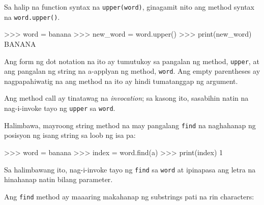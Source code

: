 \documentclass[10pt,]{book}
\newenvironment{Shaded}{}{}
\newcommand{\BuiltInTok}[1]{\textcolor[rgb]{0.00,0.50,0.00}{#1}}
\newcommand{\DecValTok}[1]{\textcolor[rgb]{0.25,0.63,0.44}{#1}}
\newcommand{\NormalTok}[1]{#1}
\newcommand{\OperatorTok}[1]{\textcolor[rgb]{0.40,0.40,0.40}{#1}}
\newcommand{\StringTok}[1]{\textcolor[rgb]{0.25,0.44,0.63}{#1}}
\begin{document}
Sa halip na function syntax na \texttt{upper(word)}, ginagamit nito ang
method syntax na \texttt{word.upper()}.


\begin{Shaded}
\begin{Highlighting}[]
\OperatorTok{\textgreater{}\textgreater{}\textgreater{}}\NormalTok{ word }\OperatorTok{=} \StringTok{\textquotesingle{}banana\textquotesingle{}}
\OperatorTok{\textgreater{}\textgreater{}\textgreater{}}\NormalTok{ new\_word }\OperatorTok{=}\NormalTok{ word.upper()}
\OperatorTok{\textgreater{}\textgreater{}\textgreater{}} \BuiltInTok{print}\NormalTok{(new\_word)}
\NormalTok{BANANA}
\end{Highlighting}
\end{Shaded}

Ang form ng dot notation na ito ay tumutukoy sa pangalan ng method,
\texttt{upper}, at ang pangalan ng string na a-applyan ng method,
\texttt{word}. Ang empty parentheses ay nagpapahiwatig na ang method na
ito ay hindi tumatanggap ng argument.


Ang method call ay tinatawag na \emph{invocation}; sa kasong ito,
sasabihin natin na nag-i-invoke tayo ng \texttt{upper} sa \texttt{word}.


Halimbawa, mayroong string method na may pangalang \texttt{find} na
naghahanap ng posisyon ng isang string sa loob ng isa pa:

\begin{Shaded}
\begin{Highlighting}[]
\OperatorTok{\textgreater{}\textgreater{}\textgreater{}}\NormalTok{ word }\OperatorTok{=} \StringTok{\textquotesingle{}banana\textquotesingle{}}
\OperatorTok{\textgreater{}\textgreater{}\textgreater{}}\NormalTok{ index }\OperatorTok{=}\NormalTok{ word.find(}\StringTok{\textquotesingle{}a\textquotesingle{}}\NormalTok{)}
\OperatorTok{\textgreater{}\textgreater{}\textgreater{}} \BuiltInTok{print}\NormalTok{(index)}
\DecValTok{1}
\end{Highlighting}
\end{Shaded}

Sa halimbawang ito, nag-i-invoke tayo ng \texttt{find} sa \texttt{word}
at ipinapasa ang letra na hinahanap natin bilang parameter.

Ang \texttt{find} method ay maaaring makahanap ng substrings pati na rin
characters:
\end{document}

